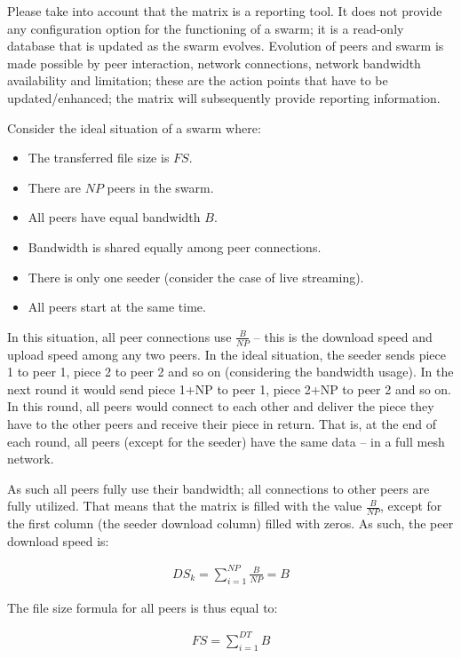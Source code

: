 Please take into account that the matrix is a reporting tool. It does not
provide any configuration option for the functioning of a swarm; it is a
read-only database that is updated as the swarm evolves. Evolution of peers
and swarm is made possible by peer interaction, network connections, network
bandwidth availability and limitation; these are the action points that have
to be updated/enhanced; the matrix will subsequently provide reporting
information.

Consider the ideal situation of a swarm where:

\begin{itemize}
  \item The transferred file size is $FS$.
  \item There are $NP$ peers in the swarm.
  \item All peers have equal bandwidth $B$.
  \item Bandwidth is shared equally among peer connections.
  \item There is only one seeder (consider the case of live streaming).
  \item All peers start at the same time.
\end{itemize}

In this situation, all peer connections use $\frac{B}{NP}$ -- this is the
download speed and upload speed among any two peers. In the ideal
situation, the seeder sends piece 1 to peer 1, piece 2 to peer 2 and so on
(considering the bandwidth usage). In the next round it would send piece 1+NP
to peer 1, piece 2+NP to peer 2 and so on. In this round, all peers would
connect to each other and deliver the piece they have to the other peers and
receive their piece in return. That is, at the end of each round, all peers
(except for the seeder) have the same data -- in a full mesh network.

As such all peers fully use their bandwidth; all connections to other peers
are fully utilized. That means that the matrix is filled with the value
$\frac{B}{NP}$, except for the first column (the seeder download column) filled
with zeros. As such, the peer download speed is:

\begin{align}
  DS_{k} = \sum_{i=1}^{NP} \frac{B}{NP} = B
\end{align}

The file size formula for all peers is thus equal to:

\begin{align}
  FS = \sum_{i=1}^{DT} B
\end{align}

